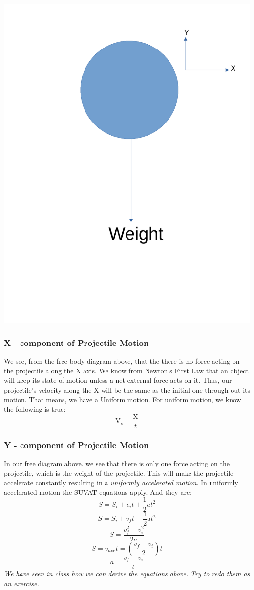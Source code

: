 \documentclass[9pt]{article}
\begin{document}
	\begin{center}
		\includegraphics[scale=0.2]{projectile_free_body_diagram}
	\end{center}
	\subsubsection*{X - component of Projectile Motion}
	We see, from the free body diagram above, that the there is no force acting on the projectile along the X axis. We know from Newton's First Law that an object will keep its state of motion unless a net external force acts on it. Thus, our projectile's velocity along the X will be the same as the initial one through out its motion. That means, we have a Uniform motion. For uniform motion, we know the following is true:
	$$\text{V}_\text{x}=\dfrac{\text{X}}{t}$$
	\subsubsection*{Y - component of Projectile Motion}
	In our free diagram above, we see that there is only one force acting on the projectile, which is the weight of the projectile. This will make the projectile accelerate constantly resulting in a \textit{uniformly accelerated motion}. In uniformly accelerated motion the SUVAT equations apply. And they are:
	$$S=S_i+v_it+\dfrac{1}{2}at^2$$
	$$S=S_i+v_ft-\dfrac{1}{2}at^2$$
	$$S=\dfrac{v_f^2-v_i^2}{2a}$$
	$$S=v_{ave}t=(\dfrac{v_f+v_i}{2})t$$
	$$a=\dfrac{v_f-v_i}{t}$$
	\textit{We have seen in class how we can derive the equations above. Try to redo them as an exercise.}
\end{document}
